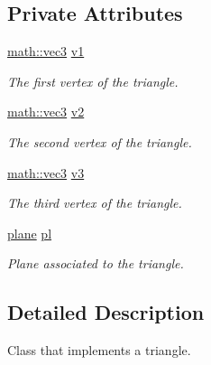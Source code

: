 \subsection*{Private Attributes}
\begin{DoxyCompactItemize}
\item 
\mbox{\label{classphysim_1_1geom_1_1triangle_ac339bfc839523549ecaf6b463c8eff32}} 
\hyperlink{structphysim_1_1math_1_1vec3}{math\+::vec3} \hyperlink{classphysim_1_1geom_1_1triangle_ac339bfc839523549ecaf6b463c8eff32}{v1}
\begin{DoxyCompactList}\small\item\em The first vertex of the triangle. \end{DoxyCompactList}\item 
\mbox{\label{classphysim_1_1geom_1_1triangle_a2d0fcc3373425eb17be35ad39e3e1bd1}} 
\hyperlink{structphysim_1_1math_1_1vec3}{math\+::vec3} \hyperlink{classphysim_1_1geom_1_1triangle_a2d0fcc3373425eb17be35ad39e3e1bd1}{v2}
\begin{DoxyCompactList}\small\item\em The second vertex of the triangle. \end{DoxyCompactList}\item 
\mbox{\label{classphysim_1_1geom_1_1triangle_a6014f960ce444144d8798a02db1f8a19}} 
\hyperlink{structphysim_1_1math_1_1vec3}{math\+::vec3} \hyperlink{classphysim_1_1geom_1_1triangle_a6014f960ce444144d8798a02db1f8a19}{v3}
\begin{DoxyCompactList}\small\item\em The third vertex of the triangle. \end{DoxyCompactList}\item 
\mbox{\label{classphysim_1_1geom_1_1triangle_a922a64002b6f20464754fdd1d1b7e382}} 
\hyperlink{classphysim_1_1geom_1_1plane}{plane} \hyperlink{classphysim_1_1geom_1_1triangle_a922a64002b6f20464754fdd1d1b7e382}{pl}
\begin{DoxyCompactList}\small\item\em Plane associated to the triangle. \end{DoxyCompactList}\end{DoxyCompactItemize}


\subsection{Detailed Description}
Class that implements a triangle. 

